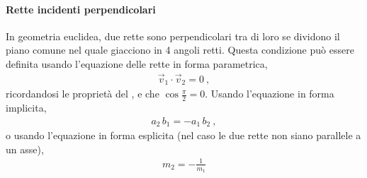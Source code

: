 \documentclass[letterpaper,10pt,italian]{jupyterBook}
\begin{document}
\paragraph{Rette incidenti perpendicolari}
\label{\detokenize{ch/analytic_geometry/analytic_geometry_2d/lines:rette-incidenti-perpendicolari}}
\sphinxAtStartPar
In geometria euclidea, due rette sono perpendicolari tra di loro se dividono il piano comune nel quale giacciono in 4 angoli retti. Questa condizione può essere definita usando l’equazione delle rette in forma parametrica,
\begin{equation*}
\begin{split}\vec{v}_1 \cdot \vec{v}_2 = 0 \ ,\end{split}
\end{equation*}
\sphinxAtStartPar
ricordandosi le proprietà del {\hyperref[\detokenize{ch/algebra/vector-algebra-euclidean-space:math-hs-algebra-vector-euclidean-space-inner-product}]{}}, e che \(\cos \frac{\pi}{2} = 0\).
Usando l’equazione in forma implicita,
\begin{equation*}
\begin{split}a_2 \, b_1 = - a_1 \, b_2 \ ,\end{split}
\end{equation*}
\sphinxAtStartPar
o usando l’equazione in forma esplicita (nel caso le due rette non siano parallele a un asse),
\begin{equation*}
\begin{split}m_2 = -\frac{1}{m_1}\end{split}
\end{equation*}
\end{document}

